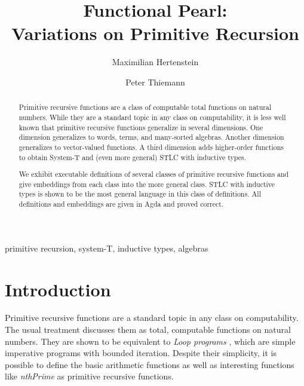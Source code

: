 \documentclass{jfp}
\begin{document}


\totalpg{\pageref{lastpage01}}

\title{Functional Pearl:\\ Variations on Primitive Recursion}

\begin{authgrp}
  \author{Maximilian Hertenstein} \qquad
  \author{Peter Thiemann}
\end{authgrp}


\begin{abstract}
Primitive recursive functions are a class of computable total
functions on natural numbers. While they are a standard topic in any
class on computability, it is less well known that primitive recursive
functions generalize in several dimensions. One dimension generalizes
to words, terms, and many-sorted algebras. Another dimension
generalizes to vector-valued functions. A third dimension adds
higher-order functions to obtain System-T and (even more general) STLC
with inductive types. 

We exhibit executable definitions of several classes of primitive
recursive functions and give embeddings from each class into the more
general class. STLC with inductive types is shown to be the most
general language in this class of definitions. All definitions and
embeddings are given in Agda and proved correct.
\end{abstract}
\begin{keywords}
primitive recursion, system-T, inductive types, algebras
\end{keywords}

\maketitle[F]

\section{Introduction}
\label{sec:introduction}

Primitive recursive functions are a standard topic in any class on
computability. 
The usual treatment discusses them as total, computable functions on
natural numbers. They are shown to be equivalent to
\emph{Loop programs}  \cite{loopsRitchie}, which are simple
imperative programs with bounded iteration.
Despite their simplicity, it is possible to define the basic
arithmetic functions as well as interesting functions like
\emph{nthPrime} as primitive recursive functions.
\end{document}
